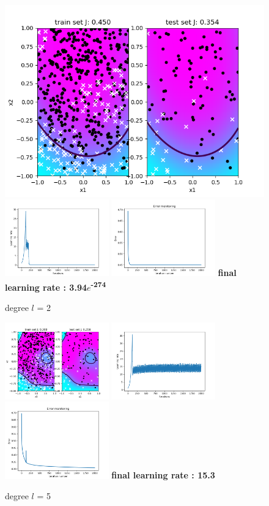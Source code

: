 \documentclass[a4paper]{article}
\begin{document}
\begin{figure}[h]	
\includegraphics[width=0.4	\textwidth]{logreg_deg2_iter2000.png}
\includegraphics[width=0.4\textwidth]{logreg_deg2_iter2000_learn.png}
\includegraphics[width=0.4\textwidth]{logreg_deg2_iter2000_error.png}
\textbf{final learning rate : 3.94$e$\textsuperscript{-274}}
\caption{degree $l$ = 2}
\end{figure}
\begin{figure}[h]	
\includegraphics[width=0.4\textwidth]{logreg_deg5_iter2000.png}
\includegraphics[width=0.4\textwidth]{logreg_deg5_iter2000_learn.png}
\includegraphics[width=0.4\textwidth]{logreg_deg5_iter2000_error.png}
\textbf{final learning rate : 15.3}
\caption{degree $l$ = 5}
\end{figure}
\end{document}
